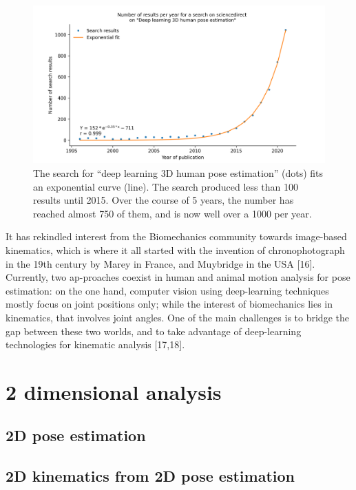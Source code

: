 \begin{figure}[hbtp]
	\centering
	\def\svgwidth{1\columnwidth}
	\fontsize{10pt}{10pt}\selectfont
	\includegraphics[width=\linewidth]{"../Chap1/Figure/Fig_exp.png"}
	\caption{The search for “deep learning 3D human pose estimation” (dots) fits an exponential curve (line). The search produced less than 100 results until 2015. Over the course of 5 years, the number has reached almost 750 of them, and is now well over a 1000 per year.}
	\label{fig_exp}
\end{figure}

It has rekindled interest from the Biomechanics community towards image-based kinematics, which is where it all started with the invention of chronophotograph in the 19th century by Marey in France, and Muybridge in the USA [16]. Currently, two ap-proaches coexist in human and animal motion analysis for pose estimation: on the one hand, computer vision using deep-learning techniques mostly focus on joint positions only; while the interest of biomechanics lies in kinematics, that involves joint angles. One of the main challenges is to bridge the gap between these two worlds, and to take advantage of deep-learning technologies for kinematic analysis [17,18]. 


\section{2 dimensional analysis}

\subsection{2D pose estimation}
\blindtext

\subsection{2D kinematics from 2D pose estimation}
\blindtext



